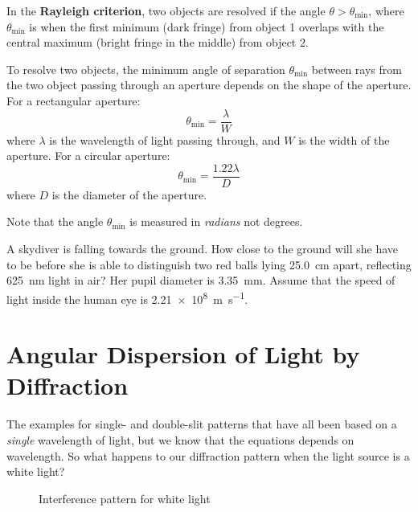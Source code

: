 %  

In the \textbf{Rayleigh criterion}, two objects are resolved if the angle
$\theta>\theta_\text{min}$, where $\theta_\text{min}$ is when the first
minimum (dark fringe) from object 1 overlaps with the central maximum
(bright fringe in the middle) from object 2.

To resolve two objects, the minimum angle of separation $\theta_\text{min}$
between rays from the two object passing through an aperture depends on the
shape of the aperture. For a rectangular aperture:
\begin{equation}
  \boxed{\theta_\text{min}=\frac\lambda W}
\end{equation}
where $\lambda$ is the wavelength of light passing through, and $W$ is the
width of the aperture. For a circular aperture:
\begin{equation}
  \boxed{\theta_\text{min}=\frac{1.22\lambda}D}
\end{equation}
where $D$ is the
diameter of the aperture.

Note that the angle $\theta_\text{min}$ is measured in \emph{radians} not
degrees.

\begin{example}
  A skydiver is falling towards the ground. How close to the ground will she
  have to be before she is able to distinguish two red balls lying
  \SI{25.0}{\centi\metre} apart, reflecting \SI{625}{\nano\metre} light in air?
  Her pupil diameter is \SI{3.35}{\milli\metre}. Assume that the speed of
  light inside the human eye is \SI{2.21e8}{\metre\per\second}.
\end{example}



\section{Angular Dispersion of Light by Diffraction}
The examples for single- and double-slit patterns that have all been based on
a \emph{single} wavelength of light, but we know that the equations depends on
wavelength. So what happens to our diffraction pattern when the light source
is a white light?
\begin{figure}[ht]
  \centering
  \caption{Interference pattern for white light}
\end{figure}

